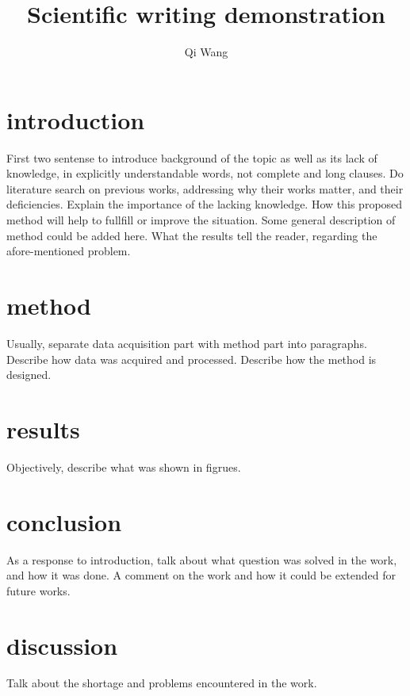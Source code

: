 \documentclass{article}
\title{Scientific writing demonstration}
\author{Qi Wang}
\begin{document}
    \maketitle
    \section*{introduction}
    First two sentense to introduce background of the topic as well as its lack of knowledge, in explicitly understandable words, not complete and long clauses. Do literature search on previous works, addressing why their works matter, and their deficiencies. Explain the importance of the lacking knowledge. How this proposed method will help to fullfill or improve the situation. Some general description of method could be added here. What the results tell the reader, regarding the afore-mentioned problem.
    \section*{method}
    Usually, separate data acquisition part with method part into paragraphs.
    Describe how data was acquired and processed. 
    Describe how the method is designed.
    \section*{results}
    Objectively, describe what was shown in figrues. 
    \section*{conclusion}
    As a response to introduction, talk about what question was solved in the work, and how it was done. A comment on the work and how it could be extended for future works.
    \section*{discussion}
    Talk about the shortage and problems encountered in the work. 
\end{document}
